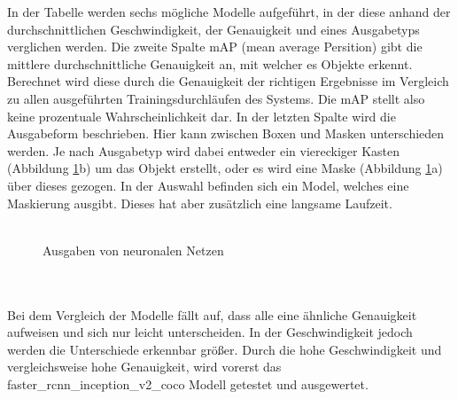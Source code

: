 \documentclass[a4paper,12pt,oneside]{article}
\begin{document}
In der Tabelle werden sechs mögliche Modelle aufgeführt, in der diese anhand der durchschnittlichen Geschwindigkeit, der Genauigkeit und eines Ausgabetyps verglichen werden. Die zweite Spalte mAP (mean average Persition) gibt die mittlere durchschnittliche Genauigkeit an, mit welcher es Objekte erkennt. Berechnet wird diese durch die Genauigkeit der richtigen Ergebnisse im Vergleich zu allen ausgeführten Trainingsdurchläufen des Systems. Die mAP stellt also keine prozentuale Wahrscheinlichkeit dar. In der letzten Spalte wird die Ausgabeform beschrieben. Hier kann zwischen Boxen und Masken unterschieden werden. Je nach Ausgabetyp wird dabei entweder ein viereckiger Kasten (Abbildung \ref{img:output}b) um das Objekt erstellt, oder es wird eine Maske (Abbildung \ref{img:output}a) über dieses gezogen. In der Auswahl befinden sich ein Model, welches eine Maskierung ausgibt. Dieses hat aber zusätzlich eine langsame Laufzeit.
\\
\\
\begin{figure} 
	[h]
	\centering
\caption{Ausgaben von neuronalen Netzen} 
\label{img:output} 
\end{figure} 
\\
\\
Bei dem Vergleich der Modelle fällt auf, dass alle eine ähnliche Genauigkeit aufweisen und sich nur leicht unterscheiden. In der Geschwindigkeit jedoch werden die Unterschiede erkennbar größer. Durch die hohe Geschwindigkeit und vergleichsweise hohe Genauigkeit, wird vorerst das faster\_rcnn\_inception\_v2\_coco Modell getestet und ausgewertet.\\\\
\end{document}
